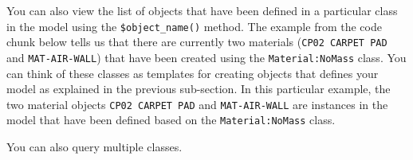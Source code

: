 \documentclass[
]{book}
\newenvironment{Shaded}{\begin{snugshade}}{\end{snugshade}}
\newcommand{\AttributeTok}[1]{\textcolor[rgb]{0.77,0.63,0.00}{#1}}
\newcommand{\ConstantTok}[1]{\textcolor[rgb]{0.00,0.00,0.00}{#1}}
\newcommand{\DocumentationTok}[1]{\textcolor[rgb]{0.56,0.35,0.01}{\textbf{\textit{#1}}}}
\newcommand{\FunctionTok}[1]{\textcolor[rgb]{0.00,0.00,0.00}{#1}}
\newcommand{\NormalTok}[1]{#1}
\newcommand{\SpecialCharTok}[1]{\textcolor[rgb]{0.00,0.00,0.00}{#1}}
\newcommand{\StringTok}[1]{\textcolor[rgb]{0.31,0.60,0.02}{#1}}
\begin{document}
\begin{Shaded}
\end{Shaded}

You can also view the list of objects that have been defined in a particular class in the model using the \texttt{\$object\_name()} method. The example from the code chunk below tells us that there are currently two materials (\texttt{CP02\ CARPET\ PAD} and \texttt{MAT-AIR-WALL}) that have been created using the \texttt{Material:NoMass} class. You can think of these classes as templates for creating objects that defines your model as explained in the previous sub-section. In this particular example, the two material objects \texttt{CP02\ CARPET\ PAD} and \texttt{MAT-AIR-WALL} are instances in the model that have been defined based on the \texttt{Material:NoMass} class.

\begin{Shaded}
\end{Shaded}

You can also query multiple classes.
\end{document}
